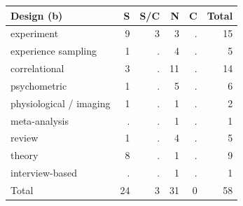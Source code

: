 \begin{center}\small
\begin{tabular}{@{}lrrrrr@{}}\toprule
Design (b) & S & S/C & N & C & Total \\ \midrule
experiment & 9 & 3 & 3 & . & 15 \\
experience sampling & 1 & . & 4 & . & 5 \\
correlational & 3 & . & 11 & . & 14 \\
psychometric & 1 & . & 5 & . & 6 \\
physiological / imaging & 1 & . & 1 & . & 2 \\
meta-analysis & . & . & 1 & . & 1 \\
review & 1 & . & 4 & . & 5 \\
theory & 8 & . & 1 & . & 9 \\
interview-based & . & . & 1 & . & 1 \\
\midrule Total & 24 & 3 & 31 & 0 & 58 \\
\bottomrule\end{tabular}\end{center}
